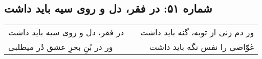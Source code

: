\begin{center}
\section*{شماره ۵۱: در فقر، دل و روی سیه باید داشت}
\label{sec:051}
\begin{longtable}{l p{0.5cm} r}
در فقر، دل و روی سیه باید داشت
&&
ور دم زنی از توبه، گنه باید داشت
\\
ور در بُنِ بحرِ عشق دُر میطلبی
&&
غوّاصی را نفس نگه باید داشت
\\
\end{longtable}
\end{center}
